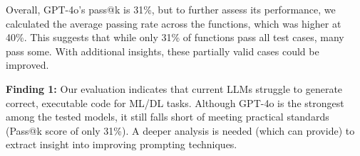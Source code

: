 


Overall, GPT-4o's pass@k is 31\%, but to further assess its performance, we calculated the average passing rate across the functions, which was higher at 40\%. This suggests that while only 31\% of functions pass all test cases, many pass some. With additional insights, these partially valid cases could be improved.




\begin{tcolorbox}[boxrule=0.5pt, colback=gray!10,  arc=4pt,left=3pt,right=3pt,top=3pt,bottom=3pt,boxsep=0pt
]
\textbf{Finding 1:} Our evaluation indicates that current LLMs struggle to generate correct, executable code for ML/DL tasks. Although GPT-4o is the strongest among the tested models, it still falls short of meeting practical standards (Pass@k score of only 31\%). 
A deeper analysis is needed (which \tool can provide) to extract insight into improving prompting techniques.
\end{tcolorbox}

